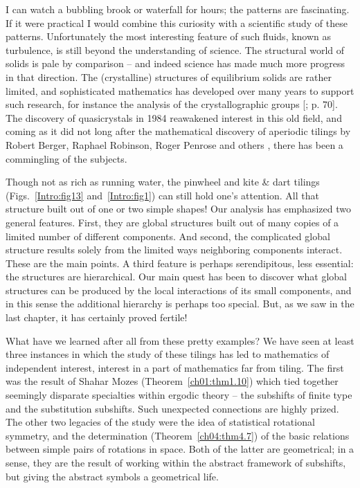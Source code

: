 \documentclass[reqno]{stml-l}
\theoremstyle{plain}
\theoremstyle{definition}
\numberwithin{equation}{chapter}
\begin{document}
I can watch a bubbling brook or waterfall for hours; the patterns are fascinating. If it were practical I would combine this curiosity with a scientific study of these patterns. Unfortunately the most interesting feature of such fluids, known as turbulence, is still beyond the understanding of science. The structural world of solids is pale by comparison -- and indeed science has made much more progress in that direction. The (crystalline) structures of equilibrium solids are rather limited, and sophisticated mathematics has developed over many years to support such research, for instance the analysis of the crystallographic groups [; p. 70]. The discovery of quasicrystals in 1984 \cite{bib:StO} reawakened interest in this old field, and coming as it did not long after the mathematical discovery of aperiodic tilings by Robert Berger, Raphael Robinson, Roger Penrose and others \cite{bib:GrS}, there has been a commingling of the subjects.

Though not as rich as running water, the pinwheel and kite \& dart tilings (Figs.~\ref{Intro:fig13} and~\ref{Intro:fig1}) can still hold one's attention. All that structure built out of one or two simple shapes! Our analysis has emphasized two general features. First, they are global structures built out of many copies of a limited number of different components. And second, the complicated global structure results solely from the
limited ways neighboring components interact. These are the main points. A third feature is perhaps serendipitous, less essential: the structures are hierarchical. Our main quest has been to discover what global structures can be produced by the local interactions of its small components, and in this sense the additional hierarchy is perhaps too special. But, as we saw in the last chapter, it has certainly proved fertile!

What have we learned after all from these pretty examples? We have seen at least three instances in which the study of these tilings has led to mathematics of independent interest, interest in a part of mathematics far from tiling. The first was the result of Shahar Mozes (Theorem~\ref{ch01:thm1.10}) which tied together seemingly disparate specialties within ergodic theory -- the subshifts of finite type and the substitution subshifts. Such unexpected connections are highly prized. The other two legacies of the study were the idea of statistical rotational symmetry, and the determination (Theorem~\ref{ch04:thm4.7}) of the basic relations between simple pairs of rotations in space. Both of the latter are geometrical; in a sense, they are the result of working within the abstract framework of subshifts, but giving the abstract symbols a geometrical life.
\end{document}

